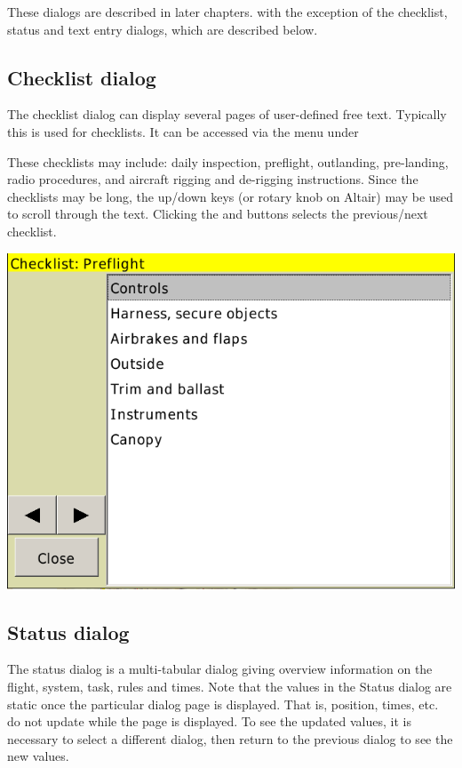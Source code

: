These dialogs are described in later chapters. with the exception of the
checklist, status and text entry dialogs, which are described below.

\subsection*{Checklist dialog}
The checklist dialog can display several pages of user-defined free text.
Typically this is used for checklists. It can be accessed via the menu under 
\begin{quote}
\blink{}
\end{quote}

These checklists may include: daily inspection, preflight, outlanding,
pre-landing, radio procedures, and aircraft rigging and de-rigging
instructions.  Since the checklists may be long, the up/down keys (or rotary
knob on Altair) may be used to scroll through the text. Clicking the
\button{$<$} and \button{$>$} buttons selects the previous/next checklist.

\begin{center}
\includegraphics[angle=0,width=0.8\linewidth,keepaspectratio='true']{figures/checklist.png}
\end{center}

\subsection*{Status dialog}
The status dialog is a multi-tabular dialog giving overview information on the 
flight, system, task, rules and times. Note that the values in the Status dialog 
are static once the particular dialog page is displayed. 
That is, position, times, etc. do not update while the page is displayed. 
To see the updated values, it is necessary to select a different dialog, 
then return to the previous dialog to see the new values.


